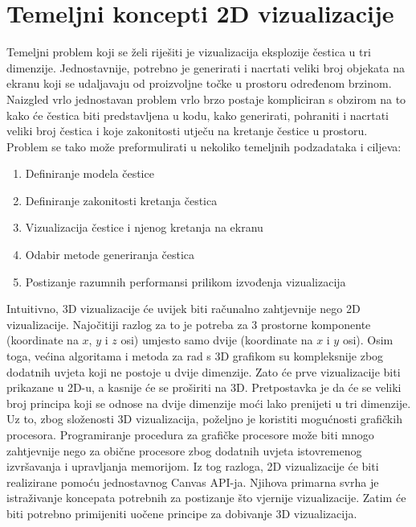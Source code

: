 \documentclass{foi}
\begin{document}
\chapter{Temeljni koncepti 2D vizualizacije}

Temeljni problem koji se želi riješiti je vizualizacija eksplozije čestica u tri dimenzije. Jednostavnije, potrebno je generirati i nacrtati veliki broj objekata na ekranu koji se udaljavaju od proizvoljne točke u prostoru određenom brzinom. Naizgled vrlo jednostavan problem vrlo brzo postaje kompliciran s obzirom na to kako će čestica biti predstavljena u kodu, kako generirati, pohraniti i nacrtati veliki broj čestica i koje zakonitosti utječu na kretanje čestice u prostoru. Problem se tako može preformulirati u nekoliko temeljnih podzadataka i ciljeva:

\begin{enumerate}
  \item Definiranje modela čestice  
  \item Definiranje zakonitosti kretanja čestica
  \item Vizualizacija čestice i njenog kretanja na ekranu
  \item Odabir metode generiranja čestica
  \item Postizanje razumnih performansi prilikom izvođenja vizualizacija
\end{enumerate}

Intuitivno, 3D vizualizacije će uvijek biti računalno zahtjevnije nego 2D vizualizacije. Najočitiji razlog za to je potreba za 3 prostorne komponente (koordinate na $x$, $y$ i $z$ osi) umjesto samo dvije (koordinate na $x$ i $y$ osi). Osim toga, većina algoritama i metoda za rad s 3D grafikom su kompleksnije zbog dodatnih uvjeta koji ne postoje u dvije dimenzije. Zato će prve vizualizacije biti prikazane u 2D-u, a kasnije će se proširiti na 3D. Pretpostavka je da će se veliki broj principa koji se odnose na dvije dimenzije moći lako prenijeti u tri dimenzije. Uz to, zbog složenosti 3D vizualizacija, poželjno je koristiti mogućnosti grafičkih procesora. Programiranje procedura za grafičke procesore može biti mnogo zahtjevnije nego za obične procesore zbog dodatnih uvjeta istovremenog izvršavanja i upravljanja memorijom. Iz tog razloga, 2D vizualizacije će biti realizirane pomoću jednostavnog Canvas API-ja. Njihova primarna svrha je istraživanje koncepata potrebnih za postizanje što vjernije vizualizacije. Zatim će biti potrebno primijeniti uočene principe za dobivanje 3D vizualizacija. 
\end{document}
